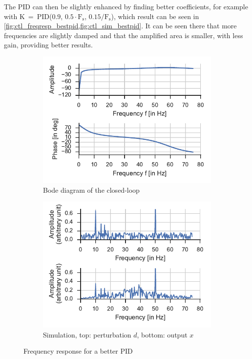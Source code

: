 The PID can then be slightly enhanced by finding better coefficients, for example with K~=~PID($0.9$, $0.5\cdot\mathrm{F_s}$, $0.15/\mathrm{F_s}$), which result can be seen in \cref{fig:ctl_freqresp_bestpid,fig:ctl_sim_bestpid}. It can be seen there that more frequencies are slightly damped and that the amplified area is smaller, with less gain, providing better results.

\begin{figure}
    \centering
    \begin{subfigure}[t]{0.49\textwidth}
        \includegraphics[width=\textwidth]{img/ctl_freqresp_bestpid}
        \caption{\label{fig:ctl_freqresp_bestpid} Bode diagram of the closed-loop}
    \end{subfigure}
    \hfill
    \begin{subfigure}[t]{0.49\textwidth}
        \includegraphics[width=\textwidth]{img/ctl_sim_bestpid}
        \caption{\label{fig:ctl_sim_bestpid}Simulation, top: perturbation $d$, bottom: output $x$}
    \end{subfigure}    
    \caption{Frequency response for a better PID}
\end{figure}

